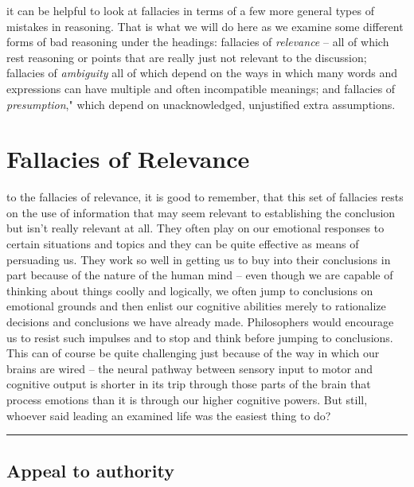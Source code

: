 \documentclass[justified]{tufte-book}
\begin{document}
 it can be helpful to look at fallacies in terms of a few more general types of mistakes in reasoning. That is what we will do here as we examine some different forms of bad reasoning under the headings: fallacies of \emph{relevance} -- all of which rest reasoning or points that are really just not relevant to the discussion; fallacies of \emph{ambiguity} all of which depend on the ways in which many words and expressions can have multiple and often incompatible meanings; and fallacies of \emph{presumption}," which depend on unacknowledged, unjustified extra assumptions.

\hypertarget{fallacies-of-relevance}{%
\section{Fallacies of Relevance}\label{fallacies-of-relevance}}

 to the fallacies of relevance, it is good to remember, that this set of fallacies rests on the use of information that may seem relevant to establishing the conclusion but isn't really relevant at all. They often play on our emotional responses to certain situations and topics and they can be quite effective as means of persuading us. They work so well in getting us to buy into their conclusions in part because of the nature of the human mind -- even though we are capable of thinking about things coolly and logically, we often jump to conclusions on emotional grounds and then enlist our cognitive abilities merely to rationalize decisions and conclusions we have already made. Philosophers would encourage us to resist such impulses and to stop and think before jumping to conclusions. This can of course be quite challenging just because of the way in which our brains are wired -- the neural pathway between sensory input to motor and cognitive output is shorter in its trip through those parts of the brain that process emotions than it is through our higher cognitive powers. But still, whoever said leading an examined life was the easiest thing to do?

\begin{center}\rule{0.5\linewidth}{\linethickness}\end{center}

\hypertarget{appeal-to-authority}{%
\subsection*{Appeal to authority}\label{appeal-to-authority}}
\end{document}
